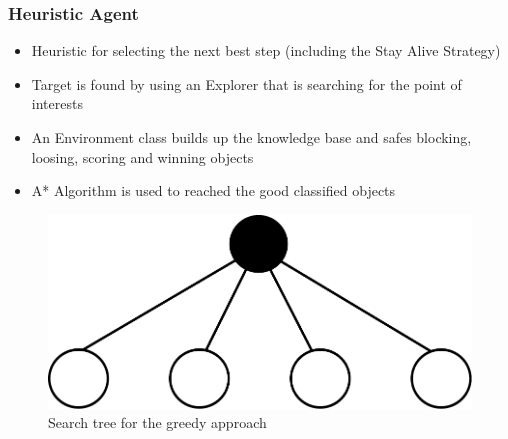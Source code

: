 \documentclass{beamer}
\begin{document}
\begin{frame}
\frametitle{Heuristic Agent}
\begin{itemize}
\item Heuristic for selecting the next best step (including the Stay Alive Strategy)
\item Target is found by using an Explorer that is searching for
the point of interests

\item An Environment class builds up the knowledge base and safes
blocking, loosing, scoring and winning objects

\item A* Algorithm is used to reached the good classified objects

\end{itemize}

\begin{figure}
\centering
\includegraphics[scale=0.3]{../report/images/onestep_lookahead.pdf}
\caption{Search tree for the greedy approach}
\label{fig:onestep}
\end{figure}

\end{frame}
\end{document}
